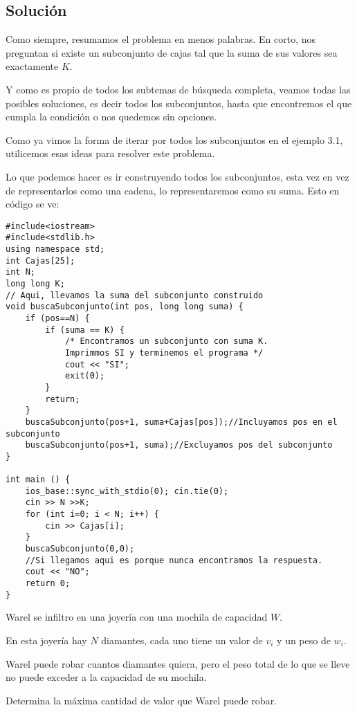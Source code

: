 \subsection*{Solución}

Como siempre, resumamos el problema en menos palabras. En corto, nos preguntan si existe un subconjunto de cajas tal que la suma de sus valores sea exactamente \(K\).

Y como es propio de todos los subtemas de búsqueda completa, veamos todas las posibles soluciones, es decir todos los subconjuntos, hasta que encontremos el que cumpla la condición o nos quedemos sin opciones.

Como ya vimos la forma de iterar por todos los subconjuntos en el ejemplo 3.1, utilicemos esas ideas para resolver este problema.

Lo que podemos hacer es ir construyendo todos los subconjuntos, esta vez en vez de representarlos como una cadena, lo representaremos como su suma. Esto en código se ve:
\newpage
\begin{lstlisting}
#include<iostream>
#include<stdlib.h>
using namespace std;
int Cajas[25];
int N;
long long K;
// Aqui, llevamos la suma del subconjunto construido
void buscaSubconjunto(int pos, long long suma) {
	if (pos==N) {
		if (suma == K) {
			/* Encontramos un subconjunto con suma K.
			Imprimmos SI y terminemos el programa */
			cout << "SI";
			exit(0);
		}
		return;
	}
	buscaSubconjunto(pos+1, suma+Cajas[pos]);//Incluyamos pos en el subconjunto
	buscaSubconjunto(pos+1, suma);//Excluyamos pos del subconjunto	
}

int main () {
	ios_base::sync_with_stdio(0); cin.tie(0);
	cin >> N >>K;
	for (int i=0; i < N; i++) {
		cin >> Cajas[i];
	}
	buscaSubconjunto(0,0);
	//Si llegamos aqui es porque nunca encontramos la respuesta.
	cout << "NO";
	return 0;
}
\end{lstlisting}

\newpage


\problemtitle Warel se infiltro en una joyería con una mochila de capacidad \(W\).

En esta joyería hay \(N\) diamantes, cada uno tiene un valor de \(v_i\) y un peso de \(w_i\).

Warel puede robar cuantos diamantes quiera, pero el peso total de lo que se lleve no puede exceder a la capacidad de su mochila.

Determina la máxima cantidad de valor que Warel puede robar.

